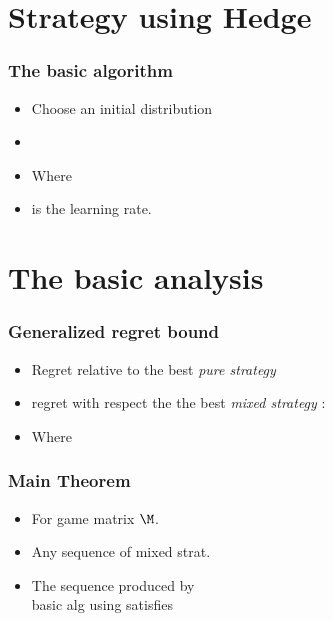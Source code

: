 \documentclass[handout]{beamer}
\begin{document}
\section{Strategy using Hedge}

\begin{frame}
\frametitle{The basic algorithm}
\begin{itemize}
\item Choose an initial distribution 
\item {}
\item Where 
\item {} is the learning rate.
\end{itemize}
\end{frame}


\section{The basic analysis}

\begin{frame}
  \frametitle{Generalized regret bound}
  \begin{itemize}
  \item Regret relative to the best {\em pure strategy}
  \item    regret with respect the the best {\em mixed strategy}
    \R{$\P$}:
  \item \small{Where }
  \end{itemize}
\end{frame}

\begin{frame}
\frametitle{Main Theorem}
\begin{itemize}
\item For  game matrix $\M$.
\item Any sequence of mixed strat. 
\item The sequence  produced by \\
basic alg using  satisfies
\end{itemize}
\end{frame}
\end{document}
